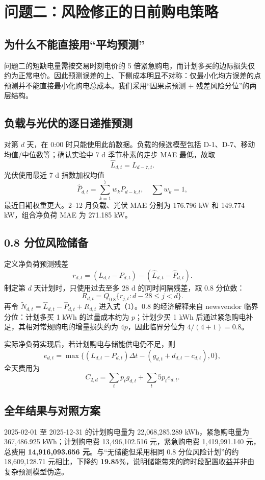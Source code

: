 \section{问题二：风险修正的日前购电策略}

\subsection{为什么不能直接用``平均预测''}

问题二的短缺电量需按交易时刻电价的 5 倍紧急购电，而计划多买的边际损失仅约为正常电价。因此预测误差的上、下侧成本明显不对称：仅最小化均方误差的点预测并不能直接最小化购电总成本。我们采用``因果点预测 + 残差风险分位''的两层结构。

\subsection{负载与光伏的逐日递推预测}

对第 $d$ 天，在 0:00 时只能使用此前数据。负载的候选模型包括 D-1、D-7、移动均值/中位数等；确认实验中 7 d 季节朴素的走步 MAE 最低，故取
\[
\hat L_{d,t}=L_{d-7,t}.
\tag{5}
\]
光伏使用最近 7 d 指数加权均值
\[
\hat P_{d,t}=\sum_{k=1}^{7}w_kP_{d-k,t},\quad \sum w_k=1,
\tag{6}
\]
最近日期权重更大。2--12 月负载、光伏 MAE 分别为 176.796 kW 和 149.774 kW，组合净负荷 MAE 为 271.185 kW。

\subsection{0.8 分位风险储备}

定义净负荷预测残差
\[
r_{d,t}=(L_{d,t}-P_{d,t})-(\hat L_{d,t}-\hat P_{d,t}).
\tag{7}
\]
制定第 $d$ 天计划时，只使用过去至多 28 d 的同时间隔残差，取 0.8 分位数：
\[
R_{d,t}=Q_{0.8}\{r_{j,t}:d-28\le j<d\}.
\tag{8}
\]
再令 $\tilde N_{d,t}=\hat L_{d,t}-\hat P_{d,t}+R_{d,t}$ 进入式（1）。0.8 的经济解释来自 newsvendor 临界分位：计划多买 1 kWh 的过量成本约为 $p$；计划少买 1 kWh 后通过紧急购电补足，其相对常规购电的增量损失约为 $4p$，因此临界分位为 $4/(4+1)=0.8$。

实际净负荷实现后，若计划购电与储能供电仍不足，则
\[
e_{d,t}=\max\{(L_{d,t}-P_{d,t})\Delta t-(g_{d,t}+d_{d,t}-c_{d,t}),0\},
\tag{9}
\]
全天费用为
\[
C_{2,d}=\sum_t p_tg_{d,t}+\sum_t5p_te_{d,t}.
\tag{10}
\]

\subsection{全年结果与对照方案}

2025-02-01 至 2025-12-31 的计划购电量为 22,068,285.289 kWh，紧急购电量为 367,486.925 kWh；计划购电费 13,496,102.516 元，紧急购电费 1,419,991.140 元，总费用 \textbf{14,916,093.656 元}。与``无储能但采用相同 0.8 分位风险计划''的约 18,609,128.71 元相比，下降约 \textbf{19.85\%}，说明储能带来的跨时段配置收益并非由复杂预测模型伪造。
